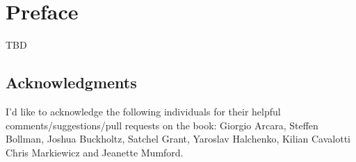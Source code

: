 \chapter*{Preface}

TBD


\section*{Acknowledgments}
I'd like to acknowledge the following individuals for their helpful comments/suggestions/pull requests on the book:  Giorgio Arcara, Steffen Bollman, Joshua Buckholtz, Satchel Grant, Yaroslav Halchenko, Kilian Cavalotti Chris Markiewicz and Jeanette Mumford.


